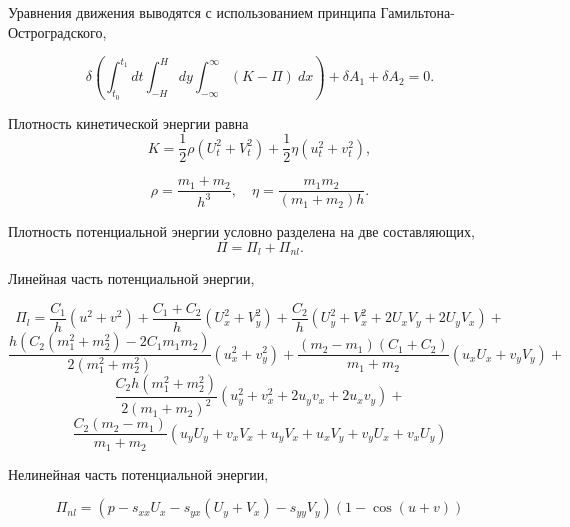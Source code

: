 \begin{frame}
Уравнения движения выводятся с использованием принципа Гамильтона-Остроградского,

$$
\delta \left( \int_{t_0}^{t_1}dt \int_{-H}^{H} dy \int_{-\infty}^{\infty}\left( K - \Pi \right)  \:   dx \right)+ \delta A_1 + \delta A_2=0.
$$

Плотность кинетической энергии равна
$$
	K = \frac{1}{2} \rho (U_t^2 + V_t^2) + \frac{1}{2} \eta (u_t^2 + v_t^2),
$$
\begin{small}
$$
\rho = \frac{m_1+m_2}{h^3}, \quad \eta = \frac{m_1 m_2}{(m_1 + m_2)h}.
$$
\end{small}

Плотность потенциальной энергии условно разделена на две составляющих,
$$
\Pi = \Pi_l + \Pi_{nl}.
$$

\end{frame}


\begin{frame}
	
Линейная часть потенциальной энергии,
\begin{small}
$$
\Pi_l = \frac{C_1}{h} \left(u^2 + v^2\right) + \frac{C_1+C_2}{h}\left(U_x^2+V_y^2\right) +\frac{C_2}{h}\left(U_y^2 + V_x^2 + 2U_x V_y + 2 U_y V_x\right) +
$$
$$
\frac{h\left(C_2\left(m_1^2 + m_2^2\right) - 2C_1 m_1 m_2\right)}{2\left(m_1^2 + m_2^2\right)}\left(u_x^2 + v_y^2\right) + \frac{\left(m_2-m_1\right)\left(C_1+C_2\right)}{m_1+m_2}\left(u_x U_x + v_y V_y\right) +
$$
$$
\frac{C_2 h\left(m_1^2+m_2^2\right)}{2\left(m_1+m_2\right)^2}\left(u_y^2+v_x^2+2u_y v_x + 2u_x v_y\right) +
$$
$$
\frac{C_2\left(m_2 - m_1\right)}{m_1 + m_2}\left(u_y U_y+v_x V_x + u_y V_x + u_x V_y + v_y U_x + v_x U_y\right)
$$
\end{small}

Нелинейная часть потенциальной энергии\footnotemark,
\begin{small}
$$
\Pi_{nl} = \left( p - s_{xx} U_x - s_{yx} \left( U_y + V_x\right) - s_{yy} V_y\right) \left( 1- \cos{(u+v)}\right) \label{pot}
$$
\end{small}		
\end{frame}

